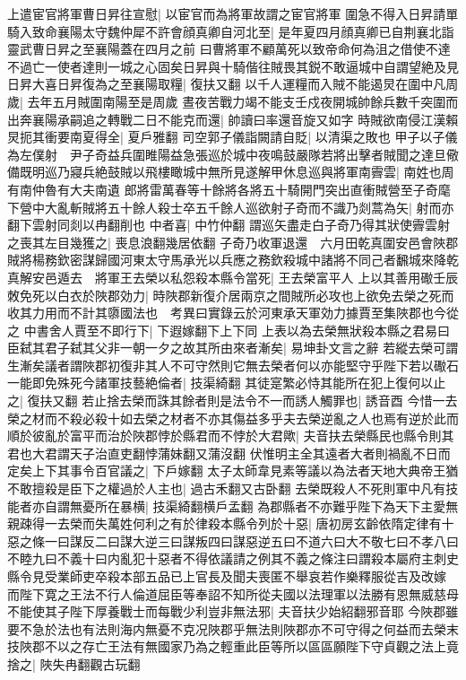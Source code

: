 上遣宦官將軍曹日昇往宣慰|{
	以宦官而為將軍故謂之宦官將軍}
圍急不得入日昇請單騎入致命襄陽太守魏仲犀不許會顔真卿自河北至|{
	是年夏四月顔真卿已自荆襄北詣靈武曹日昇之至襄陽蓋在四月之前}
曰曹將軍不顧萬死以致帝命何為沮之借使不達不過亡一使者達則一城之心固矣日昇與十騎偕往賊畏其鋭不敢逼城中自謂望絶及見日昇大喜日昇復為之至襄陽取糧|{
	復扶又翻}
以千人運糧而入賊不能遏炅在圍中凡周歲|{
	去年五月賊圍南陽至是周歲}
晝夜苦戰力竭不能支壬戍夜開城帥餘兵數千突圍而出奔襄陽承嗣追之轉戰二日不能克而還|{
	帥讀曰率還音旋又如字}
時賊欲南侵江漢賴炅扼其衝要南夏得全|{
	夏戶雅翻}
司空郭子儀詣闕請自貶|{
	以清渠之敗也}
甲子以子儀為左僕射　尹子奇益兵圍睢陽益急張巡於城中夜鳴鼓嚴隊若將出擊者賊聞之達旦儆備既明巡乃寢兵絶鼓賊以飛樓瞰城中無所見遂解甲休息巡與將軍南霽雲|{
	南姓也周有南仲魯有大夫南遺}
郎將雷萬春等十餘將各將五十騎開門突出直衝賊營至子奇麾下營中大亂斬賊將五十餘人殺士卒五千餘人巡欲射子奇而不識乃剡蒿為矢|{
	射而亦翻下雲射同剡以冉翻削也}
中者喜|{
	中竹仲翻}
謂巡矢盡走白子奇乃得其狀使霽雲射之喪其左目幾獲之|{
	喪息浪翻幾居依翻}
子奇乃收軍退還　六月田乾真圍安邑會陜郡賊將楊務欽密謀歸國河東太守馬承光以兵應之務欽殺城中諸將不同己者飜城來降乾真解安邑遁去　將軍王去榮以私怨殺本縣令當死|{
	王去榮富平人}
上以其善用礮壬辰敇免死以白衣於陜郡効力|{
	時陜郡新復介居兩京之間賊所必攻也上欲免去榮之死而收其力用而不計其隳國法也　考異曰實錄云於河東承天軍効力據賈至集陜郡也今從之}
中書舍人賈至不即行下|{
	下遐嫁翻下上下同}
上表以為去榮無狀殺本縣之君易曰臣弑其君子弑其父非一朝一夕之故其所由來者漸矣|{
	易坤卦文言之辭}
若縱去榮可謂生漸矣議者謂陜郡初復非其人不可守然則它無去榮者何以亦能堅守乎陛下若以礮石一能即免殊死今諸軍技藝絶倫者|{
	技渠綺翻}
其徒寔繁必恃其能所在犯上復何以止之|{
	復扶又翻}
若止捨去榮而誅其餘者則是法令不一而誘人觸罪也|{
	誘音酉}
今惜一去榮之材而不殺必殺十如去榮之材者不亦其傷益多乎夫去榮逆亂之人也焉有逆於此而順於彼亂於富平而治於陜郡悖於縣君而不悖於大君歟|{
	夫音扶去榮縣民也縣令則其君也大君謂天子治直吏翻悖蒲妹翻又蒲沒翻}
伏惟明主全其遠者大者則禍亂不日而定矣上下其事令百官議之|{
	下戶嫁翻}
太子太師韋見素等議以為法者天地大典帝王猶不敢擅殺是臣下之權過於人主也|{
	過古禾翻又古卧翻}
去榮既殺人不死則軍中凡有技能者亦自謂無憂所在暴横|{
	技渠綺翻横戶孟翻}
為郡縣者不亦難乎陛下為天下主愛無親疎得一去榮而失萬姓何利之有於律殺本縣令列於十惡|{
	唐初房玄齡依隋定律有十惡之條一曰謀反二曰謀大逆三曰謀叛四曰謀惡逆五曰不道六曰大不敬七曰不孝八曰不睦九曰不義十曰内亂犯十惡者不得依議請之例其不義之條注曰謂殺本屬府主刺史縣令見受業師吏卒殺本部五品已上官長及聞夫喪匿不舉哀若作樂釋服從吉及改嫁}
而陛下寛之王法不行人倫道屈臣等奉詔不知所從夫國以法理軍以法勝有恩無威慈母不能使其子陛下厚養戰士而每戰少利豈非無法邪|{
	夫音扶少始紹翻邪音耶}
今陜郡雖要不急於法也有法則海内無憂不克况陜郡乎無法則陜郡亦不可守得之何益而去榮末技陜郡不以之存亡王法有無國家乃為之輕重此臣等所以區區願陛下守貞觀之法上竟捨之|{
	陜失冉翻觀古玩翻}
